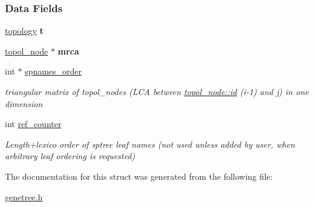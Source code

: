 \subsubsection*{Data Fields}
\begin{DoxyCompactItemize}
\item 
\mbox{\label{structspeciestree__struct_a55732a7f5b91645b88cb8b9a0d0d0b7c}} 
\hyperlink{structtopology__struct}{topology} {\bfseries t}
\item 
\mbox{\label{structspeciestree__struct_a88e2a63f6df55342314b5f7d898e54f8}} 
\hyperlink{structtopol__node__struct}{topol\+\_\+node} $\ast$ {\bfseries mrca}
\item 
\mbox{\label{structspeciestree__struct_a70069c66ad4062e05d0b6a6641866729}} 
int $\ast$ \hyperlink{structspeciestree__struct_a70069c66ad4062e05d0b6a6641866729}{spnames\+\_\+order}
\begin{DoxyCompactList}\small\item\em triangular matrix of topol\+\_\+nodes (L\+CA between \hyperlink{structtopol__node__struct_aa59aaa71c57b79b7737eb72973485a0a}{topol\+\_\+node\+::id} (i-\/1) and j) in one dimension \end{DoxyCompactList}\item 
\mbox{\label{structspeciestree__struct_af043a320e1bab001712b1fc59a1fa950}} 
int \hyperlink{structspeciestree__struct_af043a320e1bab001712b1fc59a1fa950}{ref\+\_\+counter}
\begin{DoxyCompactList}\small\item\em Length+lexico order of sptree leaf names (not used unless added by user, when arbitrary leaf ordering is requested) \end{DoxyCompactList}\end{DoxyCompactItemize}


The documentation for this struct was generated from the following file\+:\begin{DoxyCompactItemize}
\item 
\hyperlink{genetree_8h}{genetree.\+h}\end{DoxyCompactItemize}
